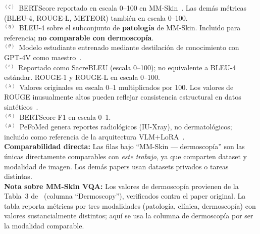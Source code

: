 \begin{table}[htbp]
{\begin{tabular}{@{}lllrrrrrl@{}}
\bottomrule
\end{tabular}%
}
\vspace{4pt}
\begin{minipage}{\textwidth}
  \footnotesize
  $^{(\zeta)}$~BERTScore reportado en escala 0--100 en MM-Skin~\cite{MMSkin2025}.
  Las demás métricas (BLEU-4, ROUGE-L, METEOR) también en escala 0--100.\\
  $^{(\eta)}$~BLEU-4 sobre el subconjunto de \textbf{patología} de MM-Skin.
  Incluido para referencia; \textbf{no comparable con dermoscopía}.\\
  $^{(\theta)}$~Modelo estudiante entrenado mediante destilación de conocimiento
  con GPT-4V como maestro~\cite{AutomatedReport2025}.\\
  $^{(\iota)}$~Reportado como SacreBLEU (escala 0--100); no equivalente a
  BLEU-4 estándar. ROUGE-1 y ROUGE-L en escala 0--100.\\
  $^{(\lambda)}$~Valores originales en escala 0--1 multiplicados por 100.
  Los valores de ROUGE inusualmente altos pueden reflejar consistencia
  estructural en datos sintéticos~\cite{DermatoLlama2025}.\\
  $^{(\kappa)}$~BERTScore F1 en escala 0--1.\\
  $^{(\mu)}$~PeFoMed genera reportes radiológicos (IU-Xray), no dermatológicos;
  incluido como referencia de la arquitectura VLM$+$LoRA~\cite{PeFoMed2024}.\\[4pt]
  \textbf{Comparabilidad directa:} Las filas bajo ``MM-Skin --- dermoscopía''
  son las únicas directamente comparables con \textit{este trabajo},
  ya que comparten dataset y modalidad de imagen.
  Los demás papers usan datasets privados o tareas distintas.\\[4pt]
  \textbf{Nota sobre MM-Skin VQA:} Los valores de dermoscopía provienen
  de la Tabla~3 de~\cite{MMSkin2025} (columna ``Dermoscopy''), verificados
  contra el paper original. La tabla reporta métricas por tres modalidades
  (patología, clínica, dermoscopía) con valores sustancialmente distintos;
  aquí se usa la columna de dermoscopía por ser la modalidad comparable.
\end{minipage}
\end{table}


